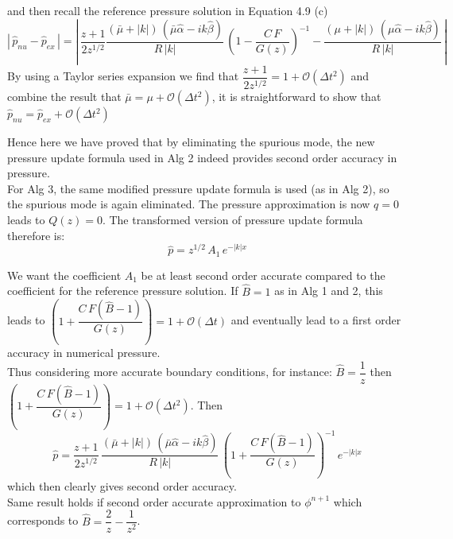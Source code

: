 and then recall the reference pressure solution in Equation 4.9 (c)
\begin{equation*}
|\,\hat{p}_{nu} - \hat{p}_{ex}\,| =|\, \dfrac{z+1}{2 z^{1/2}} \dfrac{(\bar{\mu} + |k|)\,(\bar{\mu} \hat{\alpha}  -ik \hat{\beta})}{R\,|k|} \,(1 - \dfrac{C\,F}{G(z)})^{-1} - \dfrac{(\mu + |k|)\,(\mu \hat{\alpha}  -ik \hat{\beta})}{R\,|k|}\,|
\end{equation*}
By using a Taylor series expansion we find that $\dfrac{z+1}{2z^{1/2}} = 1 + \mathcal{O}(\Delta t^2)$ and combine the result that $\bar{\mu} = \mu + \mathcal{O}(\Delta t^2)$, it is straightforward to show that $\hat{p}_{nu} = \hat{p}_{ex} + \mathcal{O}(\Delta t^2)$

Hence here we have proved that by eliminating the spurious mode, the new pressure update formula used in Alg 2 indeed provides second order accuracy in pressure.\\

For Alg 3, the same modified pressure update formula is used (as in Alg 2), so the spurious mode is again eliminated. The pressure approximation is now $q = 0$ leads to $Q(z) = 0$. The transformed version of pressure update formula therefore is:
\begin{equation*}
\hat{p} = z^{1/2}\,A_1\,e^{-|k|x}
\end{equation*}

We want the coefficient $A_1$ be at least second order accurate compared to the coefficient for the reference pressure solution. If $\hat{B}=1$ as in Alg 1 and 2, this leads to $\left(1+\dfrac{C\,F(\hat{B}-1)}{G(z)}\right) = 1+\mathcal{O}(\Delta t)$ and eventually lead to a first order accuracy in numerical pressure.\\

Thus considering more accurate boundary conditions, for instance: $\hat{B}=\dfrac{1}{z}$ then $\left(1+\dfrac{C\,F(\hat{B}-1)}{G(z)}\right)= 1+\mathcal{O}(\Delta t^2)$. Then
\begin{equation*}
\hat{p} = \dfrac{z+1}{2z^{1/2}}\,\dfrac{(\bar{\mu} + |k|)\,(\bar{\mu} \hat{\alpha}  -ik \hat{\beta})}{R\,|k|}\,\left(1+\dfrac{C\,F(\hat{B}-1)}{G(z)}\right)^{-1}\,e^{-|k|x}
\end{equation*}
which then clearly gives second order accuracy.\\

Same result holds if second order accurate approximation to $\phi^{n+1}$ which corresponds to $\hat{B} = \dfrac{2}{z}- \dfrac{1}{z^2}$.\\

